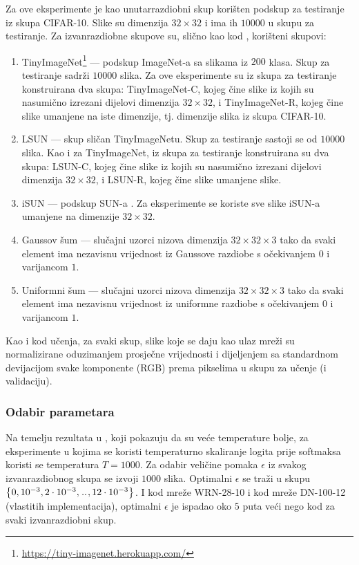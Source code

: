 \documentclass[utf8, diplomski, lmodern]{fer}
\begin{document}
Za ove eksperimente je kao unutarrazdiobni skup korišten podskup za testiranje iz skupa CIFAR-10. Slike su dimenzija $32\times 32$ i ima ih $10000$ u skupu za testiranje. Za izvanrazdiobne skupove su, slično kao kod \cite{Hendrycks:2016:BDMOODE,Liang:2017:PDOODENN}, korišteni skupovi:
\begin{enumerate}[topsep=0pt,itemsep=0pt,partopsep=0pt]
	\item TinyImageNet\footnote{\url{https://tiny-imagenet.herokuapp.com/}} --- podskup ImageNet-a \citep{Deng:2009:ILSHID} sa slikama iz $200$ klasa. Skup za testiranje sadrži $10000$ slika. Za ove eksperimente su iz skupa za testiranje konstruirana dva skupa: TinyImageNet-C, kojeg čine slike iz kojih su nasumično izrezani dijelovi dimenzija $32\times 32$, i TinyImageNet-R, kojeg čine slike umanjene na iste dimenzije, tj. dimenzije slika iz skupa CIFAR-10.
	\item LSUN \citep{Yu:2015:LSUN} --- skup sličan TinyImageNetu. Skup za testiranje sastoji se od $10000$ slika. Kao i za TinyImageNet, iz skupa za testiranje konstruirana su dva skupa: LSUN-C, kojeg čine slike iz kojih su nasumično izrezani dijelovi dimenzija $32\times 32$, i LSUN-R, kojeg čine slike umanjene slike.
	\item iSUN \citep{Xu:2015:TCSWBET} --- podskup SUN-a \citep{Xiao:2016:SUN}. Za eksperimente se koriste sve slike iSUN-a umanjene na dimenzije $32\times 32$.
	\item Gaussov šum --- slučajni uzorci nizova dimenzija $32\times 32\times 3$ tako da svaki element ima nezavisnu vrijednost iz Gaussove razdiobe s očekivanjem $0$ i varijancom $1$.
	\item Uniformni šum --- slučajni uzorci nizova dimenzija $32\times 32\times 3$ tako da svaki element ima nezavisnu vrijednost iz uniformne razdiobe s očekivanjem $0$ i varijancom $1$.
\end{enumerate}
Kao i kod učenja, za svaki skup, slike koje se daju kao ulaz mreži su normalizirane oduzimanjem prosječne vrijednosti i dijeljenjem sa standardnom devijacijom svake komponente (RGB) prema pikselima u skupu za učenje (i validaciju).

\subsubsection{Odabir parametara}

Na temelju rezultata u \cite{Liang:2017:PDOODENN}, koji pokazuju da su veće temperature bolje, za eksperimente u kojima se koristi temperaturno skaliranje logita prije softmaksa koristi se temperatura $T=1000$. Za odabir veličine pomaka $\epsilon$ iz svakog izvanrazdiobnog skupa se izvoji $1000$ slika. Optimalni $\epsilon$ se traži u skupu $\cbr{0,10^{-3},2\cdot 10^{-3},\bidot,12\cdot 10^{-3}}$. I kod mreže WRN-28-10 i kod mreže DN-100-12 (vlastitih implementacija), optimalni $\epsilon$ je ispadao oko $5$ puta veći nego kod \citet{Liang:2017:PDOODENN} za svaki izvanrazdiobni skup.
\end{document}
